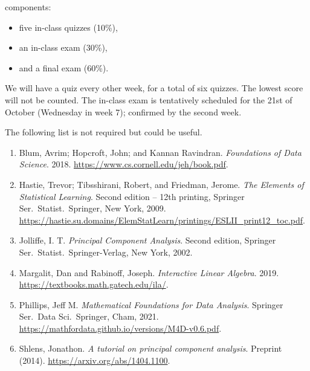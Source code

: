 \documentclass[a4paper, 12pt]{article}
\begin{document}
\begin{description}
    components: 
    \begin{itemize}
      \item five in-class quizzes (10\%),
      \item an in-class exam (30\%),
      \item and a final exam (60\%).
    \end{itemize} 
    We will have a quiz every other week, for a total of six
    quizzes. The lowest score will not be counted. The in-class exam is
    tentatively scheduled for the 21st of October (Wednesday in week 7);
    confirmed by the second week.
    \vspace{1cm}
    \item[Reading list:] The following list is not required but could be useful.
    \begin{enumerate} 
      \item Blum, Avrim; Hopcroft, John; and Kannan Ravindran.
      \textit{Foundations of Data Science}. 2018.
      \url{https://www.cs.cornell.edu/jeh/book.pdf}.
      \item Hastie, Trevor; Tibsshirani, Robert, and Friedman, Jerome. \textit{The Elements of Statistical Learning}. Second edition -- 12th printing, Springer Ser.\ Statist.\ Springer, New York, 2009. \url{https://hastie.su.domains/ElemStatLearn/printings/ESLII_print12_toc.pdf}.
      \item Jolliffe, I. T. \textit{Principal Component Analysis}. Second
      edition, Springer Ser.\ Statist.\ Springer-Verlag, New York, 2002.
      \item Margalit, Dan and Rabinoff, Joseph. \textit{Interactive Linear
      Algebra}. 2019. \url{https://textbooks.math.gatech.edu/ila/}.
      \item Phillips, Jeff M. \textit{Mathematical Foundations for Data Analysis}. Springer Ser.\ Data Sci.\ Springer, Cham, 2021. \url{https://mathfordata.github.io/versions/M4D-v0.6.pdf}.
      \item Shlens, Jonathon. \textit{A tutorial on principal component
      analysis}. Preprint (2014). \url{https://arxiv.org/abs/1404.1100}.
    \end{enumerate}
\end{description}
\end{document}
